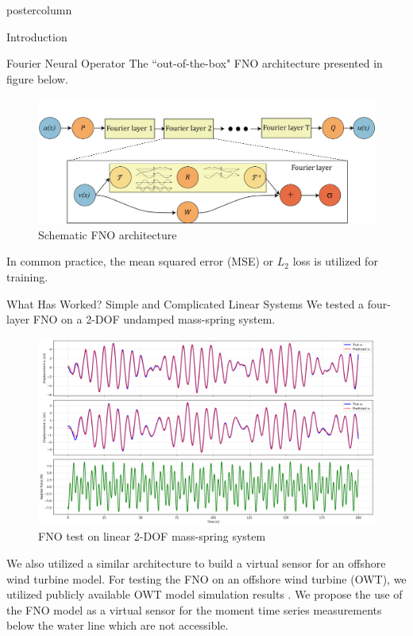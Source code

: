 \documentclass[mathserif]{beamer}
\begin{document}
\begin{frame}
\begin{columns}
\begin{beamercolorbox}[center,wd=\textwidth]{postercolumn}
\begin{minipage}[T]{.95\linewidth}
{\begin{block}{Introduction}
					\end{block}
			 
					\begin{block}{Fourier Neural Operator}
                    The ``out-of-the-box" FNO architecture \cite{kovachkiNeuralOperatorLearning2024} presented in figure below.
                    \begin{figure}
                        \centering
                        \includegraphics[width=0.6\linewidth]{figures/fourier_full_arch.png}
                        \caption{Schematic FNO architecture \cite{li2021}}
                        \label{fig:FNO}
                    \end{figure}
                    In common practice, the mean squared error (MSE) or $L_2$ loss is utilized for training. 
				 \end{block}

\begin{block}{What Has Worked? Simple and Complicated Linear Systems}
We tested a four-layer FNO on a 2-DOF undamped mass-spring system. 

\begin{figure}
         \centering
         \includegraphics[width=0.6\linewidth]{figures/0066_0000_TFNO_2dof_linear_spectral.png}
         \caption{FNO test on linear 2-DOF mass-spring system}
         \label{fig:y equals x}
\end{figure}


We also utilized a similar architecture to build a virtual sensor for an offshore wind turbine model. For testing the FNO on an offshore wind turbine (OWT), we utilized publicly available OWT model simulation results \cite{Pedersen2024}. We propose the use of the FNO model as a virtual sensor for the moment time series measurements below the water line which are not accessible. 


\end{block}}
\end{minipage}
\end{beamercolorbox}
\end{columns}
\end{frame}
\end{document}
